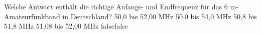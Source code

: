     {Welche Antwort enthält die richtige Anfangs- und Endfrequenz für das 6 m-Amateurfunkband in Deutschland?}
    {50,0 bis 52,00 MHz}
    {50,0 bis 54,0 MHz}
    {50,8 bis 51,8 MHz}
    {51,08 bis 52,00 MHz}
    {false}{false}